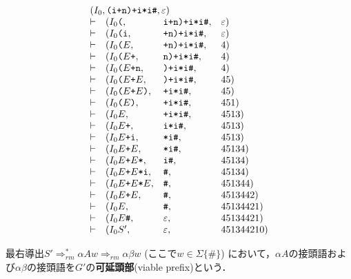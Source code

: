 \documentclass[dvipdfmx,a4j]{jbook}
\begin{document}
\begin{Exmp}
  \[\begin{array}{clll}
    \multicolumn{4}{l}{(I_0,\texttt{(i+n)+i*i\#},\varepsilon)}\\
    \vdash & (I_0\texttt{(},& \texttt{i+n)+i*i\#}, & \varepsilon)\\
    \vdash & (I_0\texttt{(i},& \texttt{+n)+i*i\#}, & \varepsilon)\\
    \vdash & (I_0\texttt{(}E,& \texttt{+n)+i*i\#}, & 4)\\
    \vdash & (I_0\texttt{(}E\texttt{+},& \texttt{n)+i*i\#}, & 4)\\
    \vdash & (I_0\texttt{(}E\texttt{+n},& \texttt{)+i*i\#}, & 4)\\
    \vdash & (I_0\texttt{(}E\texttt{+}E,& \texttt{)+i*i\#}, & 45)\\
    \vdash & (I_0\texttt{(}E\texttt{+}E\texttt{)},& \texttt{+i*i\#}, & 45)\\
    \vdash & (I_0\texttt{(}E\texttt{)},& \texttt{+i*i\#}, & 451)\\
    \vdash & (I_0E,& \texttt{+i*i\#}, & 4513)\\
    \vdash & (I_0E\texttt{+},& \texttt{i*i\#}, & 4513)\\
    \vdash & (I_0E\texttt{+i},& \texttt{*i\#}, & 4513)\\
    \vdash & (I_0E\texttt{+}E,& \texttt{*i\#}, & 45134)\\
    \vdash & (I_0E\texttt{+}E\texttt{*},& \texttt{i\#}, & 45134)\\
    \vdash & (I_0E\texttt{+}E\texttt{*i},& \texttt{\#}, & 45134)\\
    \vdash & (I_0E\texttt{+}E\texttt{*}E,& \texttt{\#}, & 451344)\\
    \vdash & (I_0E\texttt{+}E,& \texttt{\#}, & 4513442)\\
    \vdash & (I_0E,& \texttt{\#}, & 45134421)\\
    \vdash & (I_0E\texttt{\#},& \varepsilon, & 45134421)\\
    \vdash & (I_0S',& \varepsilon, & 451344210)\\
  \end{array}\]
\end{Exmp}

\begin{Def}
  最右導出$S'\Rightarrow_{rm}^\ast\alpha A w\Rightarrow_{rm}\alpha\beta w$ (ここで$w\in\Sigma\{\texttt{\#}\}$) 
  において，$\alpha A$の接頭語および$\alpha\beta$の接頭語を$G'$の{\bf 可延頭部}(viable prefix)という．
\end{Def}
\end{document}
